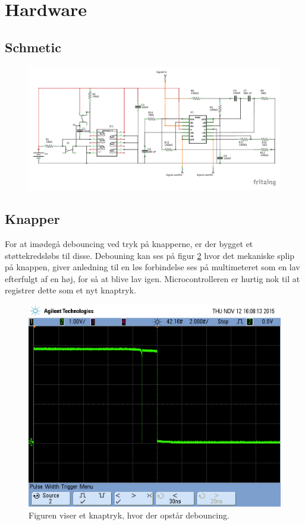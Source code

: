 \section{Hardware}

\subsection{Schmetic}
\begin{figure}[H]
	\includegraphics[trim = 0 30 0 0, clip=true, width = \textwidth]{billeder/Konditionering_schem.pdf}
	\caption{}\label{fig:schematics}
\end{figure}

\subsection{Knapper} \label{title:buttons}
For at imødegå debouncing ved tryk på knapperne, er der bygget et støttekredsløbs til disse. Debouning kan ses på figur \ref{fig:withbounce} hvor det mekaniske splip på knappen, giver anledning til en løs forbindelse ses på multimeteret som en lav efterfulgt af en høj, for så at blive lav igen. Microcontrolleren er hurtig nok til at registrer dette som et nyt knaptryk.
\begin{figure}[H]
	\includegraphics[width = \textwidth]{billeder/scope_14.png}
	\caption{Figuren viser et knaptryk, hvor der opstår debouncing.}\label{fig:withbounce}
\end{figure}


